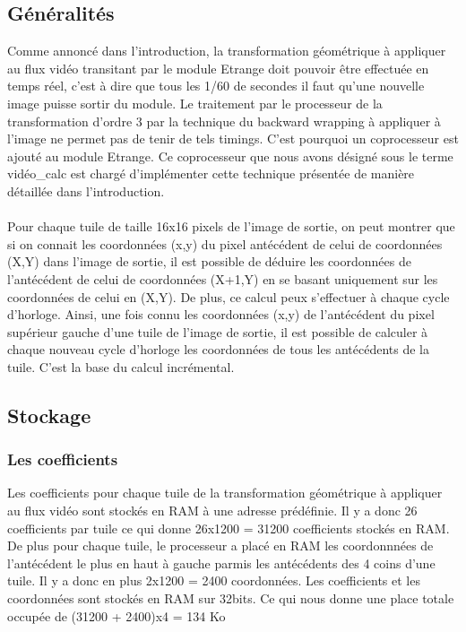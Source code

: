 \documentclass[a4paper,12pt]{report}
\begin{document}
{{    \subsection{Généralités}

Comme annoncé dans l'introduction, la transformation géométrique à appliquer au flux vidéo transitant par le module Etrange doit pouvoir être effectuée en temps réel, c'est à dire que tous les 1/60 de secondes il faut qu'une nouvelle image puisse sortir du module. Le traitement par le processeur de la transformation d'ordre 3 par la technique du backward wrapping  à appliquer à l'image ne permet pas de tenir de tels timings. C'est pourquoi un coprocesseur est ajouté au module Etrange. Ce coprocesseur que nous avons désigné sous le terme vidéo\_calc est chargé d'implémenter cette technique présentée de manière détaillée dans l'introduction.
\\
\\
Pour chaque tuile de taille 16x16 pixels de l'image de sortie, on peut montrer que si on connait les coordonnées (x,y) du pixel antécédent de celui de coordonnées (X,Y) dans l'image de sortie, il est possible de déduire les coordonnées de l'antécédent de celui de coordonnées (X+1,Y) en se basant uniquement sur les coordonnées de celui en (X,Y). De plus, ce calcul peux s'effectuer à chaque cycle d'horloge.
Ainsi, une fois connu les coordonnées (x,y) de l'antécédent du pixel supérieur gauche d'une tuile de l'image de sortie, il est possible de calculer à chaque nouveau cycle d'horloge les coordonnées de tous les antécédents de la tuile. C'est la base du calcul incrémental.

	\subsection{Stockage}

		\subsubsection*{Les coefficients}

Les coefficients pour chaque tuile de la transformation géométrique à appliquer au flux vidéo sont stockés en RAM à une adresse prédéfinie. Il y a donc 26 coefficients par tuile
ce qui donne 26x1200 = 31200 coefficients stockés en RAM. De plus pour chaque tuile, le processeur a placé en RAM les coordonnnées de l'antécédent le plus en haut à gauche parmis les antécédents des 4 coins d'une tuile. Il y a donc en plus 2x1200 = 2400 coordonnées.
Les coefficients et les coordonnées sont stockés en RAM sur 32bits. Ce qui nous donne une place totale occupée de (31200 + 2400)x4 = 134 Ko

}}
\end{document}
